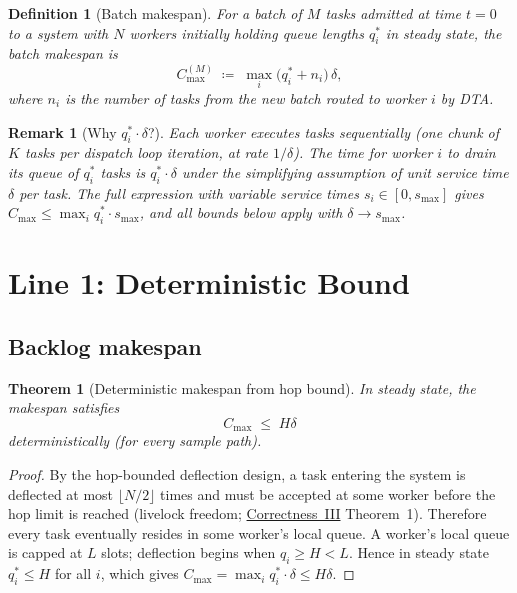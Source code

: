 \documentclass[11pt,a4paper]{report}
\newtheorem{theorem}{Theorem}[section]
\newtheorem{definition}{Definition}[section]
\newtheorem{remark}{Remark}[section]
\newcommand{\Cmax}{C_{\max}}
\begin{document}
\begin{definition}[Batch makespan]
\label{def:batch-makespan}
For a batch of $M$ tasks admitted at time $t=0$ to a system with $N$
workers initially holding queue lengths $q_i^*$ in steady state,
the \emph{batch makespan} is
\[
  \Cmax^{(M)}
  \;\coloneqq\;
  \max_i \bigl(q_i^* + n_i\bigr)\,\delta,
\]
where $n_i$ is the number of tasks from the new batch routed to worker $i$
by DTA.
\end{definition}

\begin{remark}[Why $q_i^* \cdot \delta$?]
Each worker executes tasks sequentially (one chunk of $K$ tasks per
dispatch loop iteration, at rate $1/\delta$).
The time for worker $i$ to drain its queue of $q_i^*$ tasks is
$q_i^* \cdot \delta$ under the simplifying assumption of unit service
time $\delta$ per task.
The full expression with variable service times
$s_i \in [0, s_{\max}]$ gives $\Cmax \leq \max_i q_i^* \cdot s_{\max}$,
and all bounds below apply with $\delta \to s_{\max}$.
\end{remark}

\section{Line 1: Deterministic Bound}

\subsection{Backlog makespan}

\begin{theorem}[Deterministic makespan from hop bound]
\label{thm:det-makespan}
In steady state, the makespan satisfies
\begin{equation}
  \Cmax \;\leq\; H\delta
  \label{eq:det-backlog}
\end{equation}
deterministically (for every sample path).
\end{theorem}

\begin{proof}
By the hop-bounded deflection design, a task entering the system is
deflected at most $\lfloor N/2 \rfloor$ times and must be accepted at
some worker before the hop limit is reached
(livelock freedom; \hyperref[chap:livelock]{Correctness~III} Theorem~1).
Therefore every task eventually resides in some worker's local queue.
A worker's local queue is capped at $L$ slots; deflection begins when
$q_i \geq H < L$.
Hence in steady state $q_i^* \leq H$ for all $i$, which gives
$\Cmax = \max_i q_i^* \cdot \delta \leq H\delta$.
\end{proof}
\end{document}

